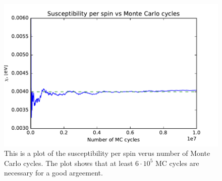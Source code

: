 \begin{figure}[H]
\includegraphics[width=\linewidth]{../results/4b/L_2_susceptibility}\caption{This is a plot of the susceptibility per spin verus number of Monte Carlo cycles. The plot shows that at least $ 6 \cdot 10^{5} $ MC cycles are necessary for a good argeement.}\label{fig:L_2_susceptibility}
\end{figure}